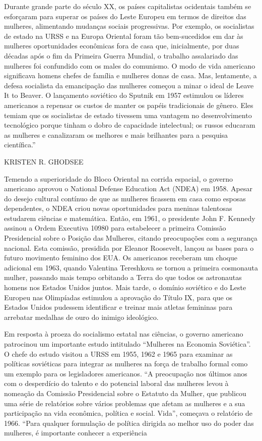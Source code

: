  \par 
Durante grande parte do século XX, os países capitalistas ocidentais também se esforçaram para superar os países do Leste Europeu em termos de direitos das mulheres, alimentando mudanças sociais progressivas. Por exemplo, os socialistas de estado na URSS e na Europa Oriental foram tão bem-sucedidos em dar às mulheres oportunidades econômicas fora de casa que, inicialmente, por duas décadas após o fim da Primeira Guerra Mundial, o trabalho assalariado das mulheres foi confundido com os males do comunismo. O modo de vida americano significava homens chefes de família e mulheres donas de casa. Mas, lentamente, a defesa socialista da emancipação das mulheres começou a minar o ideal de Leave It to Beaver. O lançamento soviético do Sputnik em 1957 estimulou os líderes americanos a repensar os custos de manter os papéis tradicionais de gênero. Eles temiam que os socialistas de estado tivessem uma vantagem no desenvolvimento tecnológico porque tinham o dobro de capacidade intelectual; os russos educaram as mulheres e canalizaram os melhores e mais brilhantes para a pesquisa científica.”
 \par 
KRISTEN R. GHODSEE
 \par 
Temendo a superioridade do Bloco Oriental na corrida espacial, o governo americano aprovou o National Defense Education Act (NDEA) em 1958. Apesar do desejo cultural contínuo de que as mulheres ficassem em casa como esposas dependentes, o NDEA criou novas oportunidades para meninas talentosas estudarem ciências e matemática. Então, em 1961, o presidente John F. Kennedy assinou a Ordem Executiva 10980 para estabelecer a primeira Comissão Presidencial sobre o Posição das Mulheres, citando preocupações com a segurança nacional. Esta comissão, presidida por Eleanor Roosevelt, lançou as bases para o futuro movimento feminino dos EUA. Os americanos receberam um choque adicional em 1963, quando Valentina Tereshkova se tornou a primeira cosmonauta mulher, passando mais tempo orbitando a Terra do que todos os astronautas homens nos Estados Unidos juntos. Mais tarde, o domínio soviético e do Leste Europeu nas Olimpíadas estimulou a aprovação do Título IX, para que os Estados Unidos pudessem identificar e treinar mais atletas femininas para arrebatar medalhas de ouro do inimigo ideológico.
 \par 
Em resposta à proeza do socialismo estatal nas ciências, o governo americano patrocinou um importante estudo intitulado “Mulheres na Economia Soviética”. O chefe do estudo visitou a URSS em 1955, 1962 e 1965 para examinar as políticas soviéticas para integrar as mulheres na força de trabalho formal como um exemplo para os legisladores americanos. “A preocupação nos últimos anos com o desperdício do talento e do potencial laboral das mulheres levou à nomeação da Comissão Presidencial sobre o Estatuto da Mulher, que publicou uma série de relatórios sobre vários problemas que afetam as mulheres e a sua participação na vida econômica, política e social. Vida”, começava o relatório de 1966. “Para qualquer formulação de política dirigida ao melhor uso do poder das mulheres, é importante conhecer a experiência
